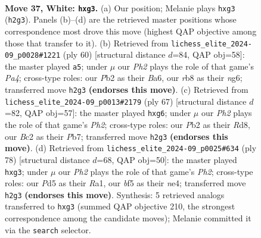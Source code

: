 \documentclass[11pt]{article}
\begin{document}
\clearpage

\begin{figure}[p]\centering
\begin{subfigure}{0.46\textwidth}\centering
\resizebox{\linewidth}{!}{%
\newchessgame
\chessboard[
  setfen={1r4k1/pp6/n5p1/2pPQbp1/8/P4Ppq/1PB4P/2RR2K1 w - - 2 37},
  showmover=false,
  pgfstyle=straightmove, color=movearrow, markmove={h2-g3}
]}
\caption{}
\end{subfigure}\hfill
\begin{subfigure}{0.46\textwidth}\centering
\resizebox{\linewidth}{!}{%
\newchessgame
\chessboard[
  setfen={3r2k1/5pp1/B3p1n1/6p1/P3QbP1/4B2P/1q3P2/5RK1 w - - 1 31},
  showmover=false,
  pgfstyle=straightmove, color=movearrow, markmove={a4-a5}
]}
\caption{}
\end{subfigure}
\\[4pt]
\begin{subfigure}{0.46\textwidth}\centering
\resizebox{\linewidth}{!}{%
\newchessgame
\chessboard[
  setfen={3r1rk1/1p5p/1q4B1/2NpP2Q/p7/P6P/1P3PP1/2R3K1 b - - 0 34},
  showmover=false,
  pgfstyle=straightmove, color=movearrow, markmove={h7-g6}
]}
\caption{}
\end{subfigure}\hfill
\begin{subfigure}{0.46\textwidth}\centering
\resizebox{\linewidth}{!}{%
\newchessgame
\chessboard[
  setfen={b5k1/P3rqp1/3p4/2p5/2P1nPp1/2BQP1p1/7P/R2R2K1 w - - 0 40},
  showmover=false,
  pgfstyle=straightmove, color=movearrow, markmove={h2-g3}
]}
\caption{}
\end{subfigure}
\caption{\textbf{Move 37, White: \texttt{hxg3}.} (a) Our position; Melanie plays \texttt{hxg3} (\texttt{h2g3}). Panels (b)--(d) are the retrieved master positions whose correspondence most drove this move (highest QAP objective among those that transfer to it). (b) Retrieved from \texttt{lichess\_elite\_2024-09\_p0028\#1221} (ply 60) [structural distance $d$=84, QAP obj=58]: the master played \texttt{a5}; under $\mu$ our \emph{Ph2} plays the role of that game's \emph{Pa4}; cross-type roles: our \emph{P}b2 as their \emph{B}a6, our \emph{r}b8 as their \emph{n}g6; transferred move \texttt{h2g3} \textbf{(endorses this move)}. (c) Retrieved from \texttt{lichess\_elite\_2024-09\_p0013\#2179} (ply 67) [structural distance $d$=82, QAP obj=57]: the master played \texttt{hxg6}; under $\mu$ our \emph{Ph2} plays the role of that game's \emph{Ph2}; cross-type roles: our \emph{P}b2 as their \emph{R}d8, our \emph{B}c2 as their \emph{P}b7; transferred move \texttt{h2g3} \textbf{(endorses this move)}. (d) Retrieved from \texttt{lichess\_elite\_2024-09\_p0025\#634} (ply 78) [structural distance $d$=68, QAP obj=50]: the master played \texttt{hxg3}; under $\mu$ our \emph{Ph2} plays the role of that game's \emph{Ph2}; cross-type roles: our \emph{P}d5 as their \emph{R}a1, our \emph{b}f5 as their \emph{n}e4; transferred move \texttt{h2g3} \textbf{(endorses this move)}. Synthesis: 5 retrieved analogs transferred to \texttt{hxg3} (summed QAP objective 210, the strongest correspondence among the candidate moves); Melanie committed it via the \texttt{search} selector.}
\label{fig:thought-m72}
\end{figure}
\end{document}
